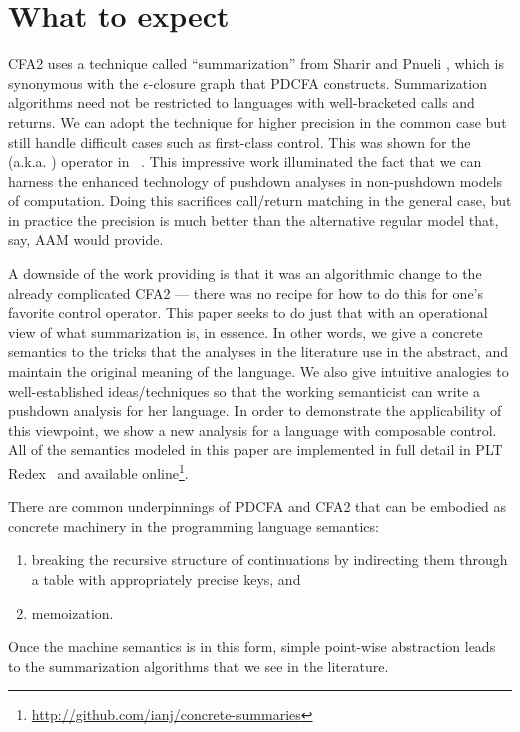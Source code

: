 \section{What to expect}

CFA2 uses a technique called ``summarization'' from Sharir and Pnueli \citep[Chapter 7]{local:muchnick:jones:flow-analysis:1981}, which is synonymous with the $\epsilon$-closure graph that PDCFA constructs.
%
Summarization algorithms need not be restricted to languages with well-bracketed calls and returns.
%
We can adopt the technique for higher precision in the common case but still handle difficult cases such as first-class control.
%
This was shown for the  (a.k.a. ) operator in ~\citet{ianjohnson:Vardoulakis2011Pushdown}.
%
This impressive work illuminated the fact that we can harness the enhanced technology of pushdown analyses in non-pushdown models of computation.
%
Doing this sacrifices call/return matching in the general case, but in practice the precision is much better than the alternative regular model that, say, AAM would provide.

A downside of the work providing  is that it was an algorithmic change to the already complicated CFA2 --- there was no recipe for how to do this for one's favorite control operator.
%
This paper seeks to do just that with an operational view of what summarization is, in essence.
%
In other words, we give a concrete semantics to the tricks that the analyses in the literature use in the abstract, and maintain the original meaning of the language.
%
We also give intuitive analogies to well-established ideas/techniques so that the working semanticist can write a pushdown analysis for her language.
%
In order to demonstrate the applicability of this viewpoint, we show a new analysis for a language with composable control.
%
All of the semantics modeled in this paper are implemented in full detail in PLT Redex~\citep{ianjohnson:Felleisen:2009:SEP:1795772} and available online\footnote{\url{http://github.com/ianj/concrete-summaries}}.

There are common underpinnings of PDCFA and CFA2 that can be embodied as concrete machinery in the programming language semantics: 
\begin{enumerate}
\item{breaking the recursive structure of continuations by indirecting them through a table with appropriately precise keys, and}
\item{memoization.}
\end{enumerate}
Once the machine semantics is in this form, simple point-wise abstraction leads to the summarization algorithms that we see in the literature.

